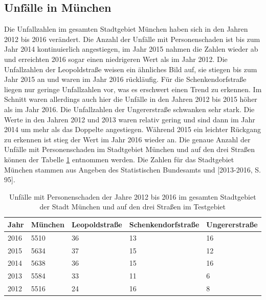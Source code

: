 \subsection{Unfälle in München}
Die Unfallzahlen im gesamten Stadtgebiet München haben sich in den Jahren 2012 bis 2016 verändert. Die Anzahl der Unfälle mit Personenschaden ist bis zum Jahr 2014 kontinuierlich angestiegen, im Jahr 2015 nahmen die Zahlen wieder ab und erreichten 2016 sogar einen niedrigeren Wert als im Jahr 2012. Die Unfallzahlen der Leopoldstraße weisen ein ähnliches Bild auf, sie stiegen bis zum Jahr 2015 an und waren im Jahr 2016 rückläufig. Für die Schenkendorfstraße liegen nur geringe Unfallzahlen vor, was es erschwert einen Trend zu erkennen. Im Schnitt waren allerdings auch hier die Unfälle in den Jahren 2012 bis 2015 höher als im Jahr 2016. Die Unfallzahlen der Ungererstraße schwanken sehr stark. Die Werte in den Jahren 2012 und 2013 waren relativ gering und sind dann im Jahr 2014 um mehr als das Doppelte angestiegen. Während 2015 ein leichter Rückgang zu erkennen ist stieg der Wert im Jahr 2016 wieder an. Die genaue Anzahl der Unfälle mit Personenschaden im Stadtgebiet München und auf den drei Straßen können der Tabelle \ref{tab:Unfälle München Personenschaden} entnommen werden. Die Zahlen für das Stadtgebiet München stammen aus Angeben des Statistischen Bundesamts \parencite[S. 98]{StatistischesBundesamt.2017} und [2013-2016, S. 95].
\begin{table}[htpb]
	\scriptsize
	\caption[Unfälle mit Personenschaden]{Unfälle mit Personenschaden der Jahre 2012 bis 2016 im gesamten Stadtgebiet der Stadt München und auf den drei Straßen im Testgebiet}\label{tab:Unfälle München Personenschaden}
	\centering
	\begin{tabular}{l l l  l p{2cm}}
		\toprule
		Jahr & München & Leopoldstraße & Schenkendorfstraße & Ungererstraße \\
		\midrule
		2016 & 5510 & 36 & 13 & 16\\
		2015 & 5634 & 37 & 15 & 12\\
		2014 & 5638 & 36 & 15 & 16\\
		2013 & 5584 & 33 & 11 & 6\\
		2012 & 5516 & 24 & 16 & 8\\
		\bottomrule
	\end{tabular}
\end{table}


